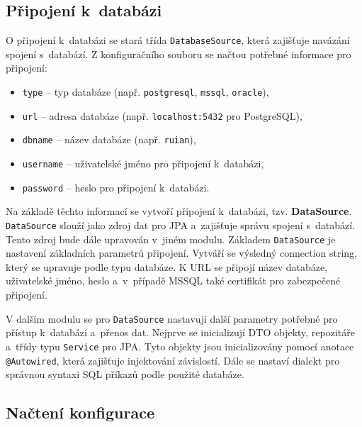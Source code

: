 \subsection{Připojení k~databázi}
O připojení k~databázi se stará třída \texttt{DatabaseSource}, která zajišťuje navázání spojení s~databází.  
Z konfiguračního souboru se načtou potřebné informace pro připojení:
\begin{itemize}
    \item \texttt{type} -- typ databáze (např. \texttt{postgresql}, \texttt{mssql}, \texttt{oracle}),
    \item \texttt{url} -- adresa databáze (např. \texttt{localhost:5432} pro PostgreSQL),
    \item \texttt{dbname} -- název databáze (např. \texttt{ruian}),
    \item \texttt{username} -- uživatelské jméno pro připojení k~databázi,
    \item \texttt{password} -- heslo pro připojení k~databázi.
\end{itemize}

Na základě těchto informací se vytvoří připojení k~databázi, tzv. \textbf{DataSource}.  
\texttt{DataSource} slouží jako zdroj dat pro JPA a~zajišťuje správu spojení s~databází.  
Tento zdroj bude dále upravován v~jiném modulu.  
Základem \texttt{DataSource} je nastavení základních parametrů připojení.  
Vytváří se výsledný connection string, který se upravuje podle typu databáze.  
K URL se připojí název databáze, uživatelské jméno, heslo a~v~případě MSSQL také certifikát pro zabezpečené připojení.

V dalším modulu se pro \texttt{DataSource} nastavují další parametry potřebné pro přístup k~databázi a~přenos dat.  
Nejprve se inicializují DTO objekty, repozitáře a~třídy typu \texttt{Service} pro JPA.  
Tyto objekty jsou inicializovány pomocí anotace \texttt{@Autowired}, která zajišťuje injektování závislostí.  
Dále se nastaví dialekt pro správnou syntaxi SQL příkazů podle použité databáze.

\subsection{Načtení konfigurace}
\label{sec:konfigurace}

